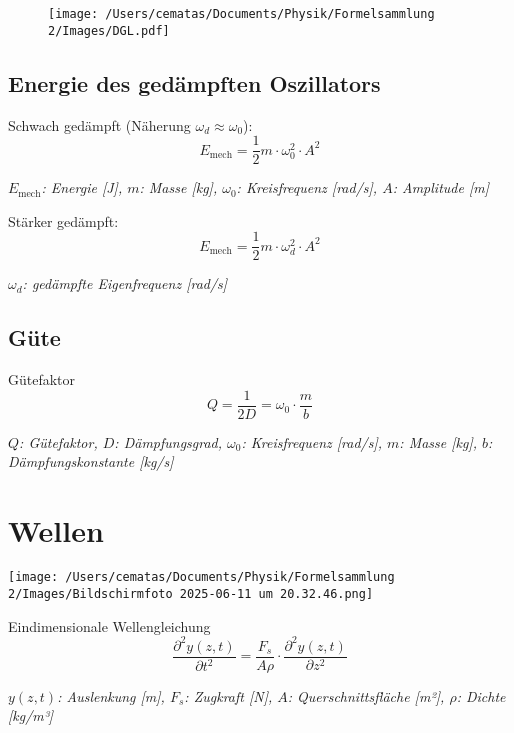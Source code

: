 \documentclass[a4paper,10pt]{article}
\newenvironment{displayformula}
{
	\begin{framed}
		\color{formulaColor}
	}
	{\end{framed}}
\newcommand{\formulalegend}[1]{%
	\par\vspace{0.5ex}%
	{{\color{legendColor}\RaggedRight\small\textit{#1}}}%
	\par\vspace{1.5ex}%
}
\begin{document}
\begin{figure}[h!]
	\centering
	\texttt{[image: /Users/cematas/Documents/Physik/Formelsammlung 2/Images/DGL.pdf]}
\end{figure}

\subsection{Energie des gedämpften Oszillators}

\begin{displayformula}
	Schwach gedämpft (Näherung \( \omega_d \approx \omega_0 \)):
	\[
	E_{\text{mech}} = \frac{1}{2} m \cdot \omega_0^2 \cdot A^2
	\]
\end{displayformula}
\formulalegend{
	\( E_{\text{mech}} \): Energie [J], \( m \): Masse [kg], \( \omega_0 \): Kreisfrequenz [rad/s], \( A \): Amplitude [m]
}

\begin{displayformula}
	Stärker gedämpft:
	\[
	E_{\text{mech}} = \frac{1}{2} m \cdot \omega_d^2 \cdot A^2
	\]
\end{displayformula}
\formulalegend{
	\( \omega_d \): gedämpfte Eigenfrequenz [rad/s]
}

\subsection{Güte}

\begin{displayformula}
	Gütefaktor
	\[
	Q = \frac{1}{2D} = \omega_0 \cdot \frac{m}{b}
	\]
\end{displayformula}
\formulalegend{
	\( Q \): Gütefaktor, \( D \): Dämpfungsgrad, \( \omega_0 \): Kreisfrequenz [rad/s], \( m \): Masse [kg], \( b \): Dämpfungskonstante [kg/s]
}

\section{Wellen}

\texttt{[image: /Users/cematas/Documents/Physik/Formelsammlung 2/Images/Bildschirmfoto 2025-06-11 um 20.32.46.png]}

\begin{displayformula}
	Eindimensionale Wellengleichung
	\[
	\frac{\partial^2 y(z,t)}{\partial t^2} = \frac{F_s}{A \rho} \cdot \frac{\partial^2 y(z,t)}{\partial z^2}
	\]
\end{displayformula}
\formulalegend{
	\( y(z,t) \): Auslenkung [m], \( F_s \): Zugkraft [N], \( A \): Querschnittsfläche [m²], \( \rho \): Dichte [kg/m³]
}
\end{document}

